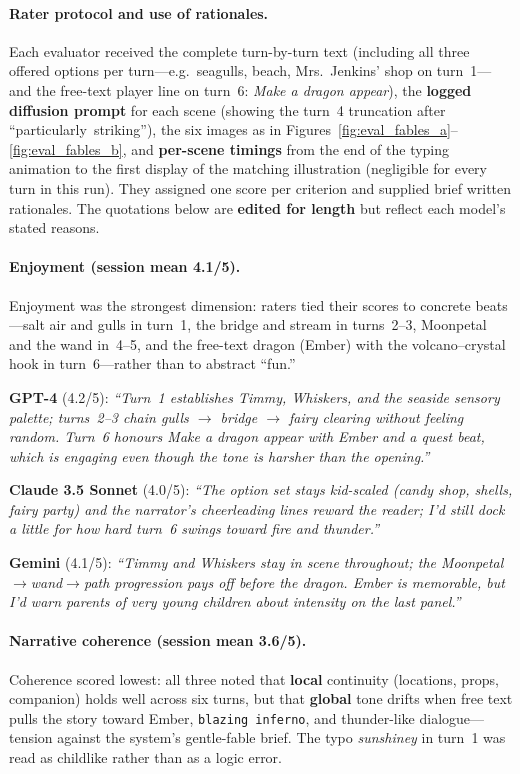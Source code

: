 \documentclass[12pt,a4paper]{article}
\begin{document}
\paragraph{Rater protocol and use of rationales.}
Each evaluator received the complete turn-by-turn text (including all three offered options per turn---e.g.\ seagulls, beach, Mrs.\ Jenkins' shop on turn~1---and the free-text player line on turn~6: \textit{Make a dragon appear}), the \textbf{logged diffusion prompt} for each scene (showing the turn~4 truncation after \mbox{``particularly striking''}), the six images as in Figures~\ref{fig:eval_fables_a}--\ref{fig:eval_fables_b}, and \textbf{per-scene timings} from the end of the typing animation to the first display of the matching illustration (negligible for every turn in this run). They assigned one score per criterion and supplied brief written rationales. The quotations below are \textbf{edited for length} but reflect each model's stated reasons.

\paragraph{Enjoyment (session mean 4.1/5).}
Enjoyment was the strongest dimension: raters tied their scores to concrete beats---salt air and gulls in turn~1, the bridge and stream in turns~2--3, Moonpetal and the wand in~4--5, and the free-text dragon (Ember) with the volcano--crystal hook in turn~6---rather than to abstract ``fun.''

\noindent\textbf{GPT-4} (4.2/5): \textit{``Turn~1 establishes Timmy, Whiskers, and the seaside sensory palette; turns~2--3 chain gulls $\rightarrow$ bridge $\rightarrow$ fairy clearing without feeling random. Turn~6 honours \emph{Make a dragon appear} with Ember and a quest beat, which is engaging even though the tone is harsher than the opening.''}

\noindent\textbf{Claude 3.5 Sonnet} (4.0/5): \textit{``The option set stays kid-scaled (candy shop, shells, fairy party) and the narrator's cheerleading lines reward the reader; I'd still dock a little for how hard turn~6 swings toward fire and thunder.''}

\noindent\textbf{Gemini} (4.1/5): \textit{``Timmy and Whiskers stay in scene throughout; the Moonpetal$\rightarrow$\allowbreak wand$\rightarrow$\allowbreak path progression pays off before the dragon. Ember is memorable, but I'd warn parents of very young children about intensity on the last panel.''}

\paragraph{Narrative coherence (session mean 3.6/5).}
Coherence scored lowest: all three noted that \textbf{local} continuity (locations, props, companion) holds well across six turns, but that \textbf{global} tone drifts when free text pulls the story toward Ember, \texttt{blazing inferno}, and thunder-like dialogue---tension against the system's gentle-fable brief. The typo \textit{sunshiney} in turn~1 was read as childlike rather than as a logic error.
\end{document}
